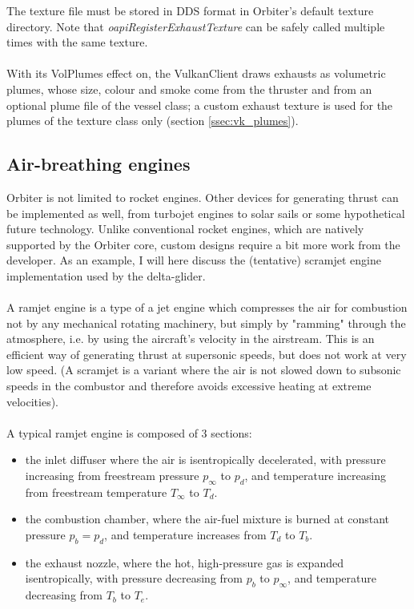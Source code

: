 \documentclass[Orbiter Developer Manual.tex]{subfiles}
\begin{document}
\noindent
The texture file must be stored in DDS format in Orbiter's default texture directory. Note that \textit{oapiRegisterExhaustTexture} can be safely called multiple times with the same texture.\\
\\
With its VolPlumes effect on, the VulkanClient draws exhausts as volumetric plumes, whose size, colour and smoke come from the thruster and from an optional plume file of the vessel class; a custom exhaust texture is used for the plumes of the texture class only (section \ref{ssec:vk_plumes}).


\subsection{Air-breathing engines}
Orbiter is not limited to rocket engines. Other devices for generating thrust can be implemented as well, from turbojet engines to solar sails or some hypothetical future technology. Unlike conventional rocket engines, which are natively supported by the Orbiter core, custom designs require a bit more work from the developer. As an example, I will here discuss the (tentative) scramjet engine implementation used by the delta-glider.\\
\\
A ramjet engine is a type of a jet engine which compresses the air for combustion not by any mechanical rotating machinery, but simply by "ramming" through the atmosphere, i.e. by using the aircraft's velocity in the airstream. This is an efficient way of generating thrust at supersonic speeds, but does not work at very low speed. (A scramjet is a variant where the air is not slowed down to subsonic speeds in the combustor and therefore avoids excessive heating at extreme velocities).\\
\\
A typical ramjet engine is composed of 3 sections:

\begin{itemize}
\item the inlet diffuser where the air is isentropically decelerated, with pressure increasing from freestream pressure $p_{\infty}$ to $p_{d}$, and temperature increasing from freestream temperature $T_{\infty}$ to $T_{d}$.
\item the combustion chamber, where the air-fuel mixture is burned at constant pressure $p_{b} = p_{d}$, and temperature increases from $T_{d}$ to $T_{b}$.
\item the exhaust nozzle, where the hot, high-pressure gas is expanded isentropically, with pressure decreasing from $p_{b}$ to $p_{\infty}$, and temperature decreasing from $T_{b}$ to $T_{e}$.
\end{itemize}
\end{document}
